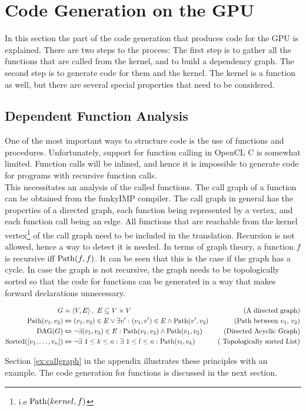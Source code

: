 \section{Code Generation on the GPU}
\label{sect:compiler_gpu}
In this section the part of the code generation that produces code for the GPU is explained. There are two steps to the process: The first step is to gather all the functions that are called from the kernel, and to build a dependency graph. The second step is to generate code for them and the kernel. The kernel is a function as well, but there are several special properties that need to be considered. 

\subsection{Dependent Function Analysis}
\label{sect:compiler_gpu_dependent_functions}
One of the most important ways to structure code is the use of functions and procedures. Unfortunately, support for function calling in OpenCL C is somewhat limited. Function calls will be inlined, and hence it is impossible to generate code for programs with recursive function calls. \cite{khronos2012specification} \\

This necessitates an analysis of the called functions. The call graph of a function can be obtained from the funkyIMP compiler. The call graph in general has the properties of a directed graph, each function being represented by a vertex, and each function call being an edge. All functions that are reachable from the kernel vertex\footnote{i.e $\operatorname{Path}(kernel, f)$} of the call graph need to be included in the translation. Recursion is not allowed, hence a way to detect it is needed. In terms of graph theory, a function $f$ is recursive iff $\operatorname{Path}(f,f)$. It can be seen that this is the case if the graph has a cycle. In case the graph is not recursive, the graph needs to be topologically sorted so that the code for functions can be generated in a way that makes forward declarations unnecessary.
\begin{small}
	\begin{align*}
		G &= \left\langle V, E \right\rangle,\ E \subseteq V\times V &\ \text{(A directed graph)} \\
		\Path(v_1,v_2) &\Leftrightarrow (v_1, v_2) \in E \vee \exists v':(v_1, v') \in E \wedge \Path(v', v_2) &\ \text{(Path between $v_1$, $v_2$)}\\
		\operatorname{DAG}(G) &\Leftrightarrow \neg\exists(v_1,v_2)\in E : \Path(v_1,v_2) \wedge \Path(v_1, v_2) &\ \text{(Directed Acyclic Graph)} \\
		\operatorname{Sorted}([v_1,\dotsc,v_n]) &\Leftrightarrow \neg\exists\ 1\leq k\leq n:\exists\ 1\leq l \leq n: \Path(v_l, v_k) &\ \text{(	Topologically sorted List)}
	\end{align*}
\end{small} 
Section \ref{ex:callgraph} in the appendix illustrates these principles with an example. The code generation for functions is discussed in the next section.

